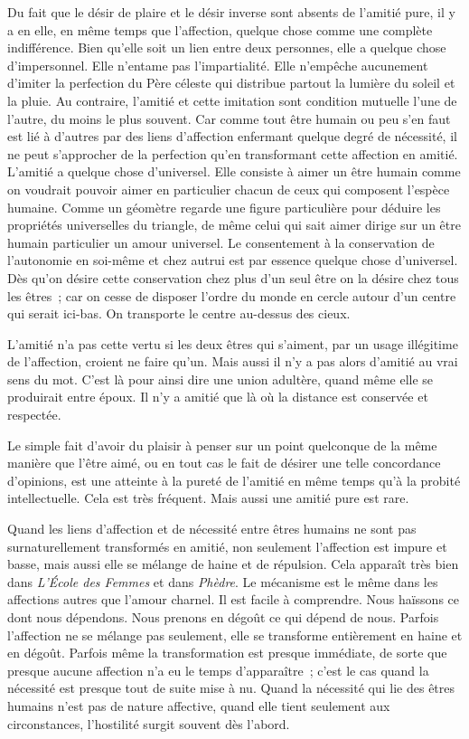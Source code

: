 \documentclass[french,twoside]{book} %
\begin{document}
Du fait que le désir de plaire et le désir inverse sont absents de l'amitié pure, il y a en elle, en même temps que l'affection, quelque chose comme une complète indifférence. Bien qu'elle soit un lien entre deux personnes, elle a quelque chose d'impersonnel. Elle n'entame pas l'impartialité. Elle n'empêche aucunement d'imiter la perfection du Père céleste qui distribue partout la lumière du soleil et la pluie. Au contraire, l'amitié et cette imitation sont condition mutuelle l'une de l'autre, du moins le plus souvent. Car comme tout être humain ou peu s'en faut est lié à d'autres par des liens d'affection enfermant quelque degré de nécessité, il ne peut s'approcher de la perfection qu'en transformant cette affection en amitié. L'amitié a quelque chose d'universel. Elle consiste à aimer un être humain comme on voudrait pouvoir aimer en particulier chacun de ceux qui composent l'espèce humaine. Comme un géomètre regarde une figure particulière pour déduire les propriétés universelles du triangle, de même celui qui sait aimer dirige sur un être humain particulier un amour universel. Le consentement à la conservation de l'autonomie en soi-même et chez autrui est par essence quelque chose d'universel. Dès qu'on désire cette conservation chez plus d'un seul être on la désire chez tous les êtres ; car on cesse de disposer l'ordre du monde en cercle autour d'un centre qui serait ici-bas. On transporte le centre au-dessus des cieux.\par
L'amitié n'a pas cette vertu si les deux êtres qui s'aiment, par un usage illégitime de l'affection, croient ne faire qu'un. Mais aussi il n'y a pas alors d'amitié au vrai sens du mot. C'est là pour ainsi dire une union adultère, quand même elle se produirait entre époux. Il n'y a amitié que là où la distance est conservée et respectée.\par
Le simple fait d'avoir du plaisir à penser sur un point quelconque de la même manière que l'être aimé, ou en tout cas le fait de désirer une telle concordance d'opinions, est une atteinte à la pureté de l'amitié en même temps qu'à la probité intellectuelle. Cela est très fréquent. Mais aussi une amitié pure est rare.\par
Quand les liens d'affection et de nécessité entre êtres humains ne sont pas surnaturellement transformés en amitié, non seulement l'affection est impure et basse, mais aussi elle se mélange de haine et de répulsion. Cela apparaît très bien dans {\itshape L'École des Femmes} et dans {\itshape Phèdre}. Le mécanisme est le même dans les affections autres que l'amour charnel. Il est facile à comprendre. Nous haïssons ce dont nous dépendons. Nous prenons en dégoût ce qui dépend de nous. Parfois l'affection ne se mélange pas seulement, elle se transforme entièrement en haine et en dégoût. Parfois même la transformation est presque immédiate, de sorte que presque aucune affection n'a eu le temps d'apparaître ; c'est le cas quand la nécessité est presque tout de suite mise à nu. Quand la nécessité qui lie des êtres humains n'est pas de nature affective, quand elle tient seulement aux circonstances, l'hostilité surgit souvent dès l'abord.\par
\end{document}
